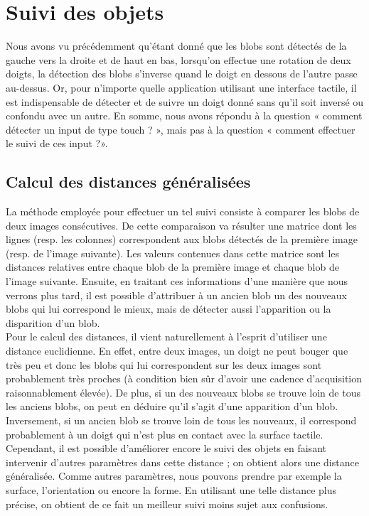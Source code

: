 \section{Suivi des objets}
Nous avons vu précédemment qu’étant donné que les blobs sont détectés de la gauche vers la
droite et de haut en bas, lorsqu’on effectue une rotation de deux doigts, la détection des blobs
s’inverse quand le doigt en dessous de l’autre passe au-dessus. Or, pour n’importe quelle application
utilisant une interface tactile, il est indispensable de détecter et de suivre un doigt donné sans qu’il
soit inversé ou confondu avec un autre. En somme, nous avons répondu à la question « comment
détecter un input de type touch ? », mais pas à la question « comment effectuer le suivi de ces
input ?».

\subsection{Calcul des distances généralisées}
La méthode employée pour effectuer un tel suivi consiste à comparer les blobs de deux images
consécutives. De cette comparaison va résulter une matrice dont les lignes (resp. les colonnes)
correspondent aux blobs détectés de la première image (resp. de l’image suivante). Les valeurs
contenues dans cette matrice sont les distances relatives entre chaque blob de la première image et
chaque blob de l’image suivante. Ensuite, en traitant ces informations d’une manière que nous
verrons plus tard, il est possible d’attribuer à un ancien blob un des nouveaux blobs qui lui
correspond le mieux, mais de détecter aussi l’apparition ou la disparition d’un blob.\\

Pour le calcul des distances, il vient naturellement à l’esprit d’utiliser une distance euclidienne.
En effet, entre deux images, un doigt ne peut bouger que très peu et donc les blobs qui lui
correspondent sur les deux images sont probablement très proches (à condition bien sûr d’avoir une
cadence d’acquisition raisonnablement élevée). De plus, si un des nouveaux blobs se trouve loin de
tous les anciens blobs, on peut en déduire qu’il s’agit d’une apparition d’un blob. Inversement, si un
ancien blob se trouve loin de tous les nouveaux, il correspond probablement à un doigt qui n’est plus
en contact avec la surface tactile. Cependant, il est possible d’améliorer encore le suivi des objets en
faisant intervenir d’autres paramètres dans cette distance ; on obtient alors une distance
généralisée. Comme autres paramètres, nous pouvons prendre par exemple la surface, l’orientation
ou encore la forme. En utilisant une telle distance plus précise, on obtient de ce fait un meilleur suivi
moins sujet aux confusions.\\

